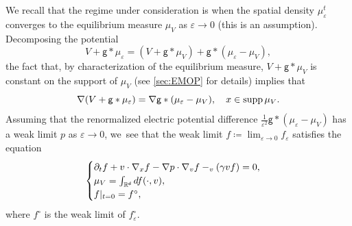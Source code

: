 \documentclass[10pt]{amsart}
\theoremstyle{plain}
\theoremstyle{definition}
\DeclarePairedDelimiter{\pa}{\lparen}{\rparen}
\DeclareMathOperator{\supp}{supp}
\let\div\relax
\DeclareMathOperator{\div}{\mathrm{div}}
\newcommand{\R}{{\mathbb{R}}}
\let\ga\gamma
\let\vep\varepsilon
\let\p\partial
\renewcommand{\d}{\mathsf{d}}
\newcommand{\g}{{\mathsf{g}}}
\begin{document}
We recall that the regime under consideration is when the spatial density $\mu_\vep^t$ converges to the equilibrium measure $\mu_V$ as $\vep\to 0$ (this is an assumption). Decomposing the potential
\begin{equation*}
V+\g\ast\mu_\vep = (V+\g\ast\mu_V) + \g\ast(\mu_\vep-\mu_V),
\end{equation*}
the fact that, {by characterization of the equilibrium measure}, $V+\g\ast\mu_V$ is constant on the support of $\mu_V$ (see \cref{sec:EMOP} for details) implies that
\begin{equation*}
\nabla\pa*{V+\g\ast\mu_\vep} = \nabla\g\ast(\mu_\vep-\mu_V), \quad x\in\supp \mu_V.
\end{equation*}
Assuming that the renormalized electric potential difference $\frac{1}{\vep^2}\g\ast(\mu_\vep-\mu_V)$ has a weak limit $p$ as $\vep\to 0$, we~see that the weak limit $f\coloneqq \lim_{\vep\to 0}f_\vep$ satisfies the equation
\begin{equation}\label{eq:KIE}
\begin{cases}
\p_tf+v\cdot\nabla_xf - \nabla p\cdot\nabla_vf -\div_v (\ga v f)=0,\\
\mu_V = \int_{\R^\d}df(\cdot,v),\\
f|_{t=0} = f^\circ,
\end{cases}
\end{equation}
where $f^\circ$ is the weak limit of $f_\vep^\circ$.
\end{document}
